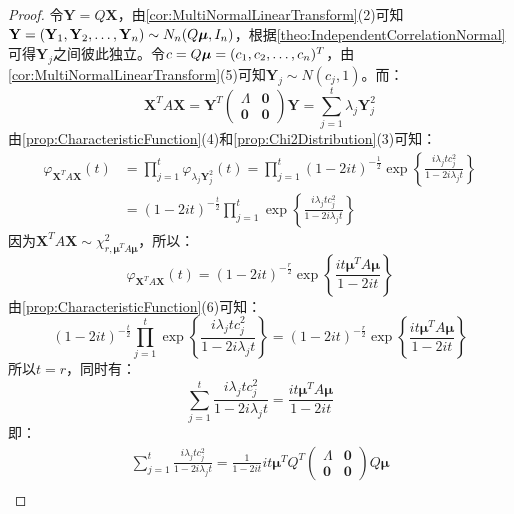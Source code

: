 \begin{proof}
	令$\mathbf{Y}=Q\mathbf{X}$，由\cref{cor:MultiNormalLinearTransform}(2)可知$\mathbf{Y}=(\mathbf{Y}_1, \mathbf{Y}_2, \dots, \mathbf{Y}_{n})\sim N_n(Q\boldsymbol{\mu},I_n)$，根据\cref{theo:IndependentCorrelationNormal}可得$\mathbf{Y}_j$之间彼此独立。令$c=Q\boldsymbol{\mu}=(c_1, c_2, \dots, c_{n})^T$，由\cref{cor:MultiNormalLinearTransform}(5)可知$\mathbf{Y}_j\sim N(c_j,1)$。而：
	\begin{equation*}
		\mathbf{X}^TA\mathbf{X}=\mathbf{Y}^T
		\begin{pmatrix}
			\varLambda & \mathbf{0} \\
			\mathbf{0} & \mathbf{0}
		\end{pmatrix}\mathbf{Y}=\sum_{j=1}^{t}\lambda_j\mathbf{Y}_j^2
	\end{equation*}
	由\cref{prop:CharacteristicFunction}(4)和\cref{prop:Chi2Distribution}(3)可知：
	\begin{align*}
		\varphi_{\mathbf{X}^TA\mathbf{X}}(t)
		&=\prod_{j=1}^{t}\varphi_{\lambda_j\mathbf{Y}_j^2}(t)=\prod_{j=1}^t(1-2it)^{-\frac{1}{2}}\exp\left\{\frac{i\lambda_jtc_j^2}{1-2i\lambda_jt}\right\} \\
		&=(1-2it)^{-\frac{t}{2}}\prod_{j=1}^t\exp\left\{\frac{i\lambda_jtc_j^2}{1-2i\lambda_jt}\right\}
	\end{align*}
	因为$\mathbf{X}^TA\mathbf{X}\sim\chi_{r,\boldsymbol{\mu}^TA\boldsymbol{\mu}}^2$，所以：
	\begin{equation*}
		\varphi_{\mathbf{X}^TA\mathbf{X}}(t)=(1-2it)^{-\frac{r}{2}}\exp\left\{\frac{it\boldsymbol{\mu}^TA\boldsymbol{\mu}}{1-2it}\right\}
	\end{equation*}
	由\cref{prop:CharacteristicFunction}(6)可知：
	\begin{equation*}
		(1-2it)^{-\frac{t}{2}}\prod_{j=1}^t\exp\left\{\frac{i\lambda_jtc_j^2}{1-2i\lambda_jt}\right\}=(1-2it)^{-\frac{r}{2}}\exp\left\{\frac{it\boldsymbol{\mu}^TA\boldsymbol{\mu}}{1-2it}\right\}
	\end{equation*}
	所以$t=r$，同时有：
	\begin{equation*}
		\sum_{j=1}^{t}\frac{i\lambda_jtc_j^2}{1-2i\lambda_jt}=\frac{it\boldsymbol{\mu}^TA\boldsymbol{\mu}}{1-2it}
	\end{equation*}
	即：
	\begin{gather*}
		\sum_{j=1}^{t}\frac{i\lambda_jtc_j^2}{1-2i\lambda_jt}=\frac{1}{1-2it}it\boldsymbol{\mu}^TQ^T
		\begin{pmatrix}
			\varLambda & \mathbf{0} \\
			\mathbf{0} & \mathbf{0}
		\end{pmatrix}
		Q\boldsymbol{\mu} \\

\end{gather*}
\end{proof}
